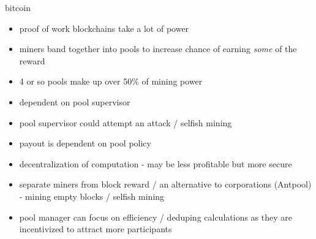 bitcoin \cite{nakamoto2009}

\begin{itemize}
  \item proof of work blockchains take a lot of power 
  \item miners band together into pools to increase chance of earning \textit{some} of the reward
  \item 4 or so pools make up over 50\% of mining power 
  \item dependent on pool supervisor
  \item pool supervisor could attempt an attack / selfish mining
  \item payout is dependent on pool policy
\end{itemize}

\begin{itemize}
  \item decentralization of computation - may be less profitable but more secure
  \item separate miners from block reward / an alternative to corporations (Antpool) - mining empty blocks / selfish mining
  \item pool manager can focus on efficiency / deduping calculations as they are incentivized to attract more participants
\end{itemize}

